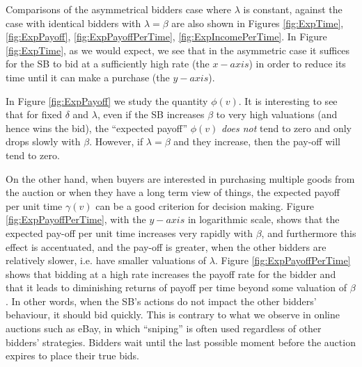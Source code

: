 \documentclass{comjnl}
\begin{document}
Comparisons of the asymmetrical bidders case where $\lambda$ is
constant, against the case with identical bidders with
$\lambda=\beta$ are also shown in Figures \ref{fig:ExpTime},
\ref{fig:ExpPayoff}, \ref{fig:ExpPayoffPerTime},
\ref{fig:ExpIncomePerTime}. In Figure \ref{fig:ExpTime}, as we
would expect, we see that in the asymmetric case it suffices for
the SB to bid at a sufficiently high rate (the $x-axis$) in order
to reduce its time until it can make a purchase (the $y-axis$).

In Figure \ref{fig:ExpPayoff} we study the quantity $\phi(v)$. It
is interesting to see that for fixed $\delta$ and $\lambda$, even
if the SB increases $\beta$ to very high valuations (and hence
wins the bid), the ``expected payoff'' $\phi(v)$  {\em does not}
tend to zero and only drops slowly with $\beta$. However, if
$\lambda=\beta$ and they increase, then the pay-off will tend to
zero.

On the other hand, when buyers are interested in purchasing
multiple goods from the auction or when they have a long term view
of things, the expected payoff per unit time $\gamma(v)$ can be a
good criterion for decision making. Figure
\ref{fig:ExpPayoffPerTime}, with the $y-axis$ in logarithmic
scale, shows that the expected pay-off per unit time increases
very rapidly with $\beta$, and furthermore this effect is
accentuated, and the pay-off is greater, when the other bidders
are relatively slower, i.e. have smaller valuations of $\lambda$.
Figure \ref{fig:ExpPayoffPerTime} shows that bidding at a high
rate increases the payoff rate for the bidder and that it leads to
diminishing returns of payoff per time beyond some valuation of
$\beta$. In other words, when the SB's actions do not impact the
other bidders' behaviour, it should bid quickly. This is contrary
to what we observe in online auctions such as eBay, in which
``sniping'' is often used regardless of other bidders' strategies.
Bidders wait until the last possible moment before the auction
expires to place their true bids.
\end{document}
